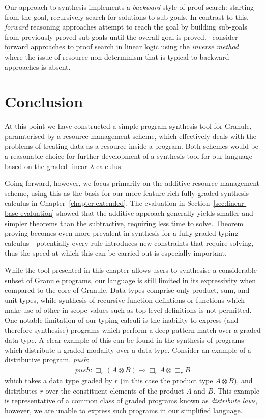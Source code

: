 Our approach to synthesis implements a \textit{backward} style of proof search:
starting from the goal, recursively search for solutions to sub-goals. In
contrast to this, \textit{forward} reasoning approaches attempt to reach the
goal by building sub-goals from previously proved sub-goals until the overall
goal is proved.~\citet{10.1007/11532231_6,10.1007/11538363_15} consider forward
approaches to proof search in linear logic using the \textit{inverse
method}~\citep{DEGTYAREV2001179} where the issue of resource non-determinism
that is typical to backward approaches is absent.

\section{Conclusion}
\label{sec:linear-base-conclusion}

At this point we have constructed a simple program synthesis tool for Granule,
paramterised by a resource management scheme, which effectively deals with the
problems of treating data as a resource inside a program. Both schemes would be
a reasonable choice for further development of a synthesis tool for our language
based on the graded linear $\lambda$-calculus.   

Going forward, however, we focus primarily on the additive resource management
scheme, using this as the basis for our more feature-rich fully-graded synthesis
calculus in Chapter~\ref{chapter:extended}.  
The evaluation in Section~\ref{sec:linear-base-evaluation} showed that the
additive approach generally yields smaller and simpler theorems than the
subtractive, requiring less time to solve. Theorem proving becomes even more
prevalent in synthesis for a fully graded typing calculus - potentially every
rule introduces new constraints that require solving, thus the speed at which
this can be carried out is especially important.

While the tool presented in this chapter allows users to synthesise a
considerable subset of Granule programs, our language is still limited in its
expressivity when compared to the core of Granule. Data types comprise only
product, sum, and unit types, while synthesis of recursive function defintions
or functions which make use of other in-scope values such as top-level
definitions is not permitted. One notable limitation of our typing calculi is
the inability to express (and therefore synthesise) programs which perform a
deep pattern match over a graded data type. A clear example of this can be found
in the synthesis of programs which distribute a graded modality over a data
type. Consider an example of a distributive program, \textit{push}:
\begin{align*}
  push: \Box_r(A \otimes B) \multimap \Box_r A \otimes \Box_r B
\end{align*}
which takes a data type graded by $r$ (in this case the product type $A \otimes
B$), and distributes $r$ over the constituent elements of the product $A$ and
$B$. This example is representative of a common class of graded programs known
as \emph{distribute laws}, however, we are unable to express such programs in
our simplified language.

